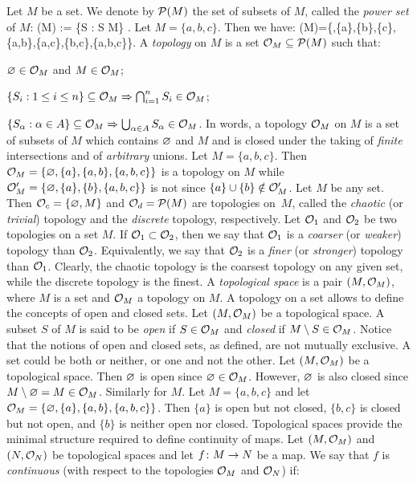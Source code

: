 Let $M$ be a set. We denote by $\mathcal{P}(M)$ the set of subsets of $M$, called the \emph{power set} of $M$:
\bse
\cP(M) := \{S : S \se M\} .
\ese
\be
Let $M = \{a,b,c\}$. Then we have:
\bse
\cP(M)=\{\vn,\{a\},\{b\},\{c\},\{a,b\},\{a,c\},\{b,c\},\{a,b,c\}\}.
\ese
\ee
\bd
A \emph{topology} on $M$ is a set $\mathcal{O}_M \subseteq \mathcal{P}(M)$ such that:
\ben
\item $\varnothing \in \mathcal{O}_M$ and $M \in \mathcal{O}_M$;
\item $\{S_i:1\leq i\leq n \} \subseteq \mathcal{O}_M \Rightarrow \bigcap_{i=1}^n S_i \in \mathcal{O}_M$;
\item $\{S_\alpha:\alpha\in A\} \subseteq \mathcal{O}_M \Rightarrow \bigcup_{\alpha\in A} S_\alpha \in \mathcal{O}_M$.
\een
\ed
In words, a topology $\mathcal{O}_M$ on $M$ is a set of subsets of $M$ which contains $\varnothing$ and $M$ and is closed under the taking of \emph{finite} intersections and of \emph{arbitrary} unions.
\be
Let $M = \{a,b,c\}$. Then $\mathcal{O}_M=\{\varnothing,\{a\},\{a,b\},\{a,b,c\}\}$ is a topology on $M$ while $\mathcal{O}_M'=\{\varnothing,\{a\},\{b\},\{a,b,c\}\}$ is not since $\{a\}\cup\{b\}\notin\mathcal{O}_M'$.
\ee
\be
Let $M$ be any set. Then $\mathcal{O}_c=\{\varnothing,M\}$ and $\mathcal{O}_d=\mathcal{P}(M)$ are topologies on~$M$, called the \emph{chaotic} (or \emph{trivial}) topology and the \emph{discrete} topology, respectively.
\ee
\bd
Let $\mathcal{O}_1$ and $\mathcal{O}_2$ be two topologies on a set $M$. If $\mathcal{O}_1 \subset \mathcal{O}_2$, then we say that $\mathcal{O}_1$ is a \emph{coarser} (or \emph{weaker}) topology than $\mathcal{O}_2$. Equivalently, we say that $\mathcal{O}_2$ is a \emph{finer} (or \emph{stronger}) topology than $\mathcal{O}_1$.
\ed
Clearly, the chaotic topology is the coarsest topology on any given set, while the discrete topology is the finest.
\bd
A \emph{topological space} is a pair $(M,\mathcal{O}_M)$, where $M$ is a set and $\mathcal{O}_M$ a topology on $M$.
\ed
A topology on a set allows to define the concepts of open and closed sets.
\bd
Let $(M,\mathcal{O}_M)$ be a topological space. A subset $S$ of $M$ is said to be \emph{open} if $S \in \mathcal{O}_M$ and \emph{closed} if $M\setminus S \in \mathcal{O}_M$. 
\ed
Notice that the notions of open and closed sets, as defined, are not mutually exclusive. A set could be both or neither, or one and not the other.
\be
Let $(M,\mathcal{O}_M)$ be a topological space. Then $\varnothing$ is open since $\varnothing \in \mathcal{O}_M$. However, $\varnothing$ is also closed since $M\setminus \varnothing = M \in \mathcal{O}_M$. Similarly for $M$.
\ee
\be
Let $M = \{a,b,c\}$ and let $\mathcal{O}_M=\{\varnothing,\{a\},\{a,b\},\{a,b,c\}\}$. Then $\{a\}$ is open but not closed, $\{b,c\}$ is closed but not open, and $\{b\}$ is neither open nor closed.
\ee
Topological spaces provide the minimal structure required to define continuity of maps.
\bd
Let $(M,\mathcal{O}_M)$ and $(N,\mathcal{O}_N)$ be topological spaces and let $f\colon M\to N$ be a map. We say that $f$ is \emph{continuous} (with respect to the topologies $\mathcal{O}_M$ and $\mathcal{O}_N$) if:

